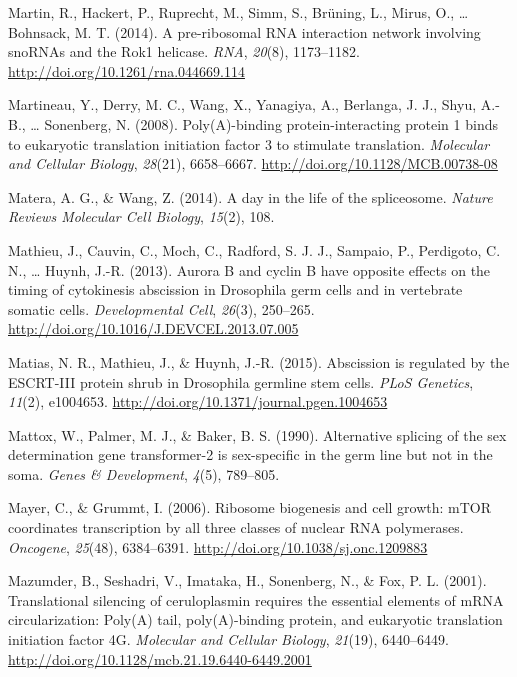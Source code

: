 \documentclass[12pt,oneside]{reedthesis}
\newlength{\cslhangindent}
\newenvironment{cslreferences}%
  {\setlength{\parindent}{0pt}%
  \everypar{\setlength{\hangindent}{\cslhangindent}}\ignorespaces}%
  {\par}
\begin{document}
\begin{cslreferences}
\leavevmode\hypertarget{ref-martinPreribosomalRNAInteraction2014}{}%
Martin, R., Hackert, P., Ruprecht, M., Simm, S., Brüning, L., Mirus, O., \ldots{} Bohnsack, M. T. (2014). A pre-ribosomal RNA interaction network involving snoRNAs and the Rok1 helicase. \emph{RNA}, \emph{20}(8), 1173--1182. \url{http://doi.org/10.1261/rna.044669.114}

\leavevmode\hypertarget{ref-Martineau2008c}{}%
Martineau, Y., Derry, M. C., Wang, X., Yanagiya, A., Berlanga, J. J., Shyu, A.-B., \ldots{} Sonenberg, N. (2008). Poly(A)-binding protein-interacting protein 1 binds to eukaryotic translation initiation factor 3 to stimulate translation. \emph{Molecular and Cellular Biology}, \emph{28}(21), 6658--6667. \url{http://doi.org/10.1128/MCB.00738-08}

\leavevmode\hypertarget{ref-Matera2014}{}%
Matera, A. G., \& Wang, Z. (2014). A day in the life of the spliceosome. \emph{Nature Reviews Molecular Cell Biology}, \emph{15}(2), 108.

\leavevmode\hypertarget{ref-Mathieu2013d}{}%
Mathieu, J., Cauvin, C., Moch, C., Radford, S. J. J., Sampaio, P., Perdigoto, C. N., \ldots{} Huynh, J.-R. (2013). Aurora B and cyclin B have opposite effects on the timing of cytokinesis abscission in Drosophila germ cells and in vertebrate somatic cells. \emph{Developmental Cell}, \emph{26}(3), 250--265. \url{http://doi.org/10.1016/J.DEVCEL.2013.07.005}

\leavevmode\hypertarget{ref-Matias2015g}{}%
Matias, N. R., Mathieu, J., \& Huynh, J.-R. (2015). Abscission is regulated by the ESCRT-III protein shrub in Drosophila germline stem cells. \emph{PLoS Genetics}, \emph{11}(2), e1004653. \url{http://doi.org/10.1371/journal.pgen.1004653}

\leavevmode\hypertarget{ref-Mattox1990}{}%
Mattox, W., Palmer, M. J., \& Baker, B. S. (1990). Alternative splicing of the sex determination gene transformer-2 is sex-specific in the germ line but not in the soma. \emph{Genes \& Development}, \emph{4}(5), 789--805.

\leavevmode\hypertarget{ref-Mayer2006a}{}%
Mayer, C., \& Grummt, I. (2006). Ribosome biogenesis and cell growth: mTOR coordinates transcription by all three classes of nuclear RNA polymerases. \emph{Oncogene}, \emph{25}(48), 6384--6391. \url{http://doi.org/10.1038/sj.onc.1209883}

\leavevmode\hypertarget{ref-Mazumder2001k}{}%
Mazumder, B., Seshadri, V., Imataka, H., Sonenberg, N., \& Fox, P. L. (2001). Translational silencing of ceruloplasmin requires the essential elements of mRNA circularization: Poly(A) tail, poly(A)-binding protein, and eukaryotic translation initiation factor 4G. \emph{Molecular and Cellular Biology}, \emph{21}(19), 6440--6449. \url{http://doi.org/10.1128/mcb.21.19.6440-6449.2001}


\end{cslreferences}
\end{document}
